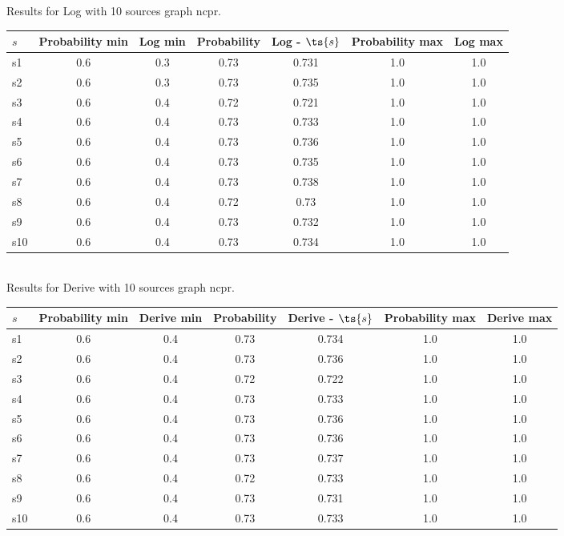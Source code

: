 \documentclass{article}
\begin{document}
\noindent Results for Log with 10 sources graph ncpr.

\noindent\begin{tabular}{|l|c|c|c|c|c|c|}
\hline
$s$& Probability min & Log min & Probability & Log - $\ts{s}$ & Probability max & Log max\\
\hline
s1 &0.6 & 0.3 & 0.73 & 0.731 & 1.0 & 1.0\\
\hline
s2 &0.6 & 0.3 & 0.73 & 0.735 & 1.0 & 1.0\\
\hline
s3 &0.6 & 0.4 & 0.72 & 0.721 & 1.0 & 1.0\\
\hline
s4 &0.6 & 0.4 & 0.73 & 0.733 & 1.0 & 1.0\\
\hline
s5 &0.6 & 0.4 & 0.73 & 0.736 & 1.0 & 1.0\\
\hline
s6 &0.6 & 0.4 & 0.73 & 0.735 & 1.0 & 1.0\\
\hline
s7 &0.6 & 0.4 & 0.73 & 0.738 & 1.0 & 1.0\\
\hline
s8 &0.6 & 0.4 & 0.72 & 0.73 & 1.0 & 1.0\\
\hline
s9 &0.6 & 0.4 & 0.73 & 0.732 & 1.0 & 1.0\\
\hline
s10 &0.6 & 0.4 & 0.73 & 0.734 & 1.0 & 1.0\\
\hline
\end{tabular}\\

\noindent Results for Derive with 10 sources graph ncpr.

\noindent\begin{tabular}{|l|c|c|c|c|c|c|}
\hline
$s$& Probability min & Derive min & Probability & Derive - $\ts{s}$ & Probability max & Derive max\\
\hline
s1 &0.6 & 0.4 & 0.73 & 0.734 & 1.0 & 1.0\\
\hline
s2 &0.6 & 0.4 & 0.73 & 0.736 & 1.0 & 1.0\\
\hline
s3 &0.6 & 0.4 & 0.72 & 0.722 & 1.0 & 1.0\\
\hline
s4 &0.6 & 0.4 & 0.73 & 0.733 & 1.0 & 1.0\\
\hline
s5 &0.6 & 0.4 & 0.73 & 0.736 & 1.0 & 1.0\\
\hline
s6 &0.6 & 0.4 & 0.73 & 0.736 & 1.0 & 1.0\\
\hline
s7 &0.6 & 0.4 & 0.73 & 0.737 & 1.0 & 1.0\\
\hline
s8 &0.6 & 0.4 & 0.72 & 0.733 & 1.0 & 1.0\\
\hline
s9 &0.6 & 0.4 & 0.73 & 0.731 & 1.0 & 1.0\\
\hline
s10 &0.6 & 0.4 & 0.73 & 0.733 & 1.0 & 1.0\\
\hline
\end{tabular}\\
\end{document}
